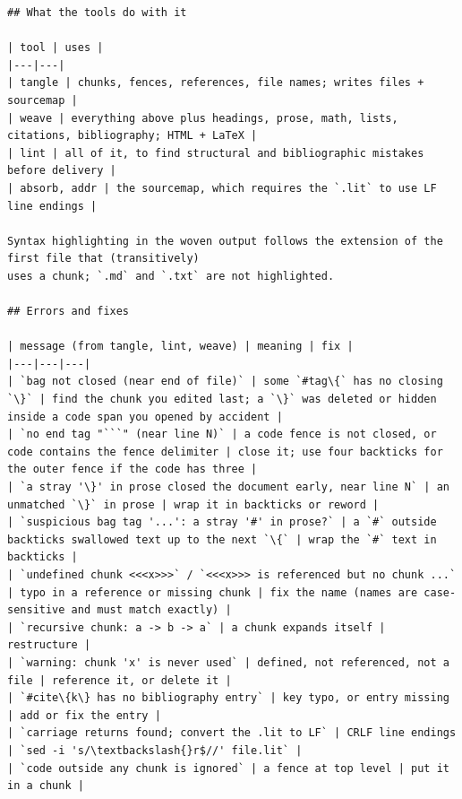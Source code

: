 \documentclass[10pt,a4paper]{article}
\newcounter{chunk}
\begin{document}
\begin{Verbatim}
## What the tools do with it

| tool | uses |
|---|---|
| tangle | chunks, fences, references, file names; writes files + sourcemap |
| weave | everything above plus headings, prose, math, lists, citations, bibliography; HTML + LaTeX |
| lint | all of it, to find structural and bibliographic mistakes before delivery |
| absorb, addr | the sourcemap, which requires the `.lit` to use LF line endings |

Syntax highlighting in the woven output follows the extension of the first file that (transitively)
uses a chunk; `.md` and `.txt` are not highlighted.

## Errors and fixes

| message (from tangle, lint, weave) | meaning | fix |
|---|---|---|
| `bag not closed (near end of file)` | some `#tag\{` has no closing `\}` | find the chunk you edited last; a `\}` was deleted or hidden inside a code span you opened by accident |
| `no end tag "```" (near line N)` | a code fence is not closed, or code contains the fence delimiter | close it; use four backticks for the outer fence if the code has three |
| `a stray '\}' in prose closed the document early, near line N` | an unmatched `\}` in prose | wrap it in backticks or reword |
| `suspicious bag tag '...': a stray '#' in prose?` | a `#` outside backticks swallowed text up to the next `\{` | wrap the `#` text in backticks |
| `undefined chunk <<<x>>>` / `<<<x>>> is referenced but no chunk ...` | typo in a reference or missing chunk | fix the name (names are case-sensitive and must match exactly) |
| `recursive chunk: a -> b -> a` | a chunk expands itself | restructure |
| `warning: chunk 'x' is never used` | defined, not referenced, not a file | reference it, or delete it |
| `#cite\{k\} has no bibliography entry` | key typo, or entry missing | add or fix the entry |
| `carriage returns found; convert the .lit to LF` | CRLF line endings | `sed -i 's/\textbackslash{}r$//' file.lit` |
| `code outside any chunk is ignored` | a fence at top level | put it in a chunk |
\end{Verbatim}
\end{document}
